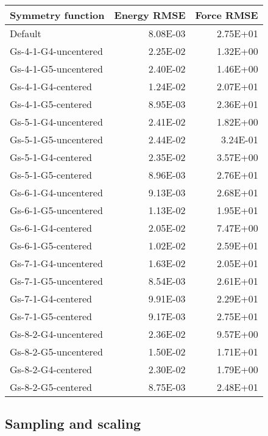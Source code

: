 \begin{tabular}{lrr}
\toprule
    Symmetry function &  Energy RMSE &  Force RMSE \\
\midrule
              Default &     8.08E-03 &    2.75E+01 \\
 Gs-4-1-G4-uncentered &     2.25E-02 &    1.32E+00 \\
 Gs-4-1-G5-uncentered &     2.40E-02 &    1.46E+00 \\
   Gs-4-1-G4-centered &     1.24E-02 &    2.07E+01 \\
   Gs-4-1-G5-centered &     8.95E-03 &    2.36E+01 \\
 Gs-5-1-G4-uncentered &     2.41E-02 &    1.82E+00 \\
 Gs-5-1-G5-uncentered &     2.44E-02 &    3.24E-01 \\
   Gs-5-1-G4-centered &     2.35E-02 &    3.57E+00 \\
   Gs-5-1-G5-centered &     8.96E-03 &    2.76E+01 \\
 Gs-6-1-G4-uncentered &     9.13E-03 &    2.68E+01 \\
 Gs-6-1-G5-uncentered &     1.13E-02 &    1.95E+01 \\
   Gs-6-1-G4-centered &     2.05E-02 &    7.47E+00 \\
   Gs-6-1-G5-centered &     1.02E-02 &    2.59E+01 \\
 Gs-7-1-G4-uncentered &     1.63E-02 &    2.05E+01 \\
 Gs-7-1-G5-uncentered &     8.54E-03 &    2.61E+01 \\
   Gs-7-1-G4-centered &     9.91E-03 &    2.29E+01 \\
   Gs-7-1-G5-centered &     9.17E-03 &    2.75E+01 \\
 Gs-8-2-G4-uncentered &     2.36E-02 &    9.57E+00 \\
 Gs-8-2-G5-uncentered &     1.50E-02 &    1.71E+01 \\
   Gs-8-2-G4-centered &     2.30E-02 &    1.79E+00 \\
   Gs-8-2-G5-centered &     8.75E-03 &    2.48E+01 \\
\bottomrule
\end{tabular}

\subsection{Sampling and scaling}

